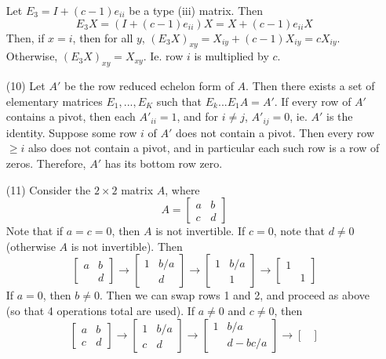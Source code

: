 \begin{itemize}
Let $E_3 = I + (c - 1)e_{ii}$ be a type (iii) matrix. Then
$$E_3X = (I + (c - 1)e_{ii})X = X + (c-1)e_{ii}X$$
Then, if $x = i$, then for all $y$, $(E_3X)_{xy} = X_{iy} + (c-1)X_{iy} = cX_{iy}$. Otherwise, $(E_3X)_{xy} = X_{xy}$. Ie. row $i$ is multiplied by $c$.
\item[(10)]
Let $A'$ be the row reduced echelon form of $A$. Then there exists a set of elementary matrices $E_1, ..., E_K$ such that $E_k...E_1A = A'$. If every row of $A'$ contains a pivot, then each $A'_{ii} = 1$, and  for $ i \neq j$, $A'_{ij} = 0$, ie. $A'$ is the identity. Suppose some row $i$ of $A'$ does not contain a pivot. Then every row $\geq i$ also does not contain a pivot, and in particular each such row is a row of zeros. Therefore, $A'$ has its bottom row zero.
\item[(11)]
Consider the $2 \times 2$ matrix $A$, where
$$A = \begin{bmatrix}
a & b \\
c & d
\end{bmatrix}$$
Note that if $a = c = 0$, then $A$ is not invertible. If $c = 0$, note that $d \neq 0$ (otherwise $A$ is not invertible). Then
$$\begin{bmatrix}
a & b \\
& d
\end{bmatrix} \rightarrow \begin{bmatrix}
1 & b/a \\
& d
\end{bmatrix} \rightarrow \begin{bmatrix}
1 & b/a \\
& 1
\end{bmatrix} \rightarrow \begin{bmatrix}
1 & \\
& 1
\end{bmatrix}$$
If $a = 0$, then $b \neq 0$. Then we can swap rows 1 and 2, and proceed as above (so that 4 operations total are used). If $a \neq 0$ and $c \neq 0$, then
$$\begin{bmatrix}
a & b \\
c & d
\end{bmatrix} \rightarrow \begin{bmatrix}
1 & b/a \\
c & d
\end{bmatrix} \rightarrow \begin{bmatrix}
1 & b/a \\
& d - bc/a
\end{bmatrix} \rightarrow \begin{bmatrix}

\end{bmatrix}$$
\end{itemize}
